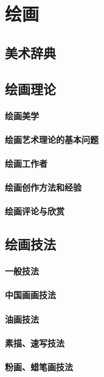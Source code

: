 \documentclass[UTF8]{../RepresentationUniverse}
\begin{document}
\chapter{绘画}

\section{美术辞典}
\section{绘画理论}
    \subsubsection{绘画美学}
    \subsubsection{绘画艺术理论的基本问题}
    \subsubsection{绘画工作者}
    \subsubsection{绘画创作方法和经验}
    \subsubsection{绘画评论与欣赏}
\section{绘画技法}
    \subsubsection{一般技法}
    \subsubsection{中国画画技法}
    \subsubsection{油画技法}
    \subsubsection{素描、速写技法}
    \subsubsection{粉画、蜡笔画技法}
\end{document}
